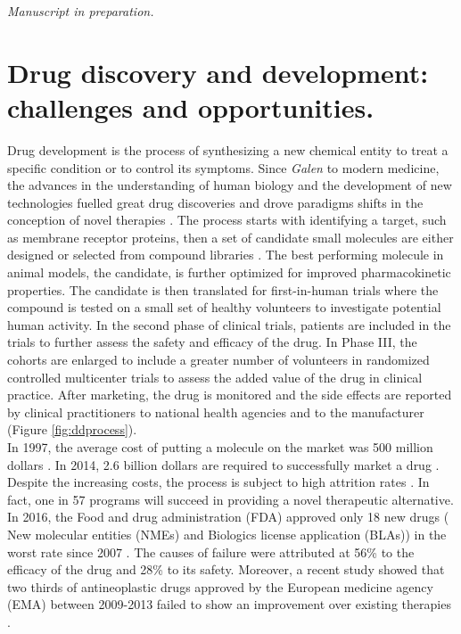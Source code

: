 \textit{Manuscript in preparation.}

\section{Drug discovery and development: challenges and opportunities.}
Drug development is the process of synthesizing a new chemical entity to treat a specific condition or to control its symptoms. Since \textit{Galen} to modern medicine, the advances in the understanding of human biology and the development of new technologies fuelled great drug discoveries and drove paradigms shifts in the conception of novel therapies \cite{drews2000drug,knowles2003target}. The process starts with identifying a target, such as membrane receptor proteins, then a set of candidate small molecules are either designed or selected from compound libraries \cite{cook2014lessons,willmann2008molecular}. The best performing molecule in animal models, the candidate, is further optimized for improved pharmacokinetic properties. The candidate is then translated for first-in-human trials where the compound is tested on a small set of healthy volunteers to investigate potential human activity. In the second phase of clinical trials, patients are included in the trials to further assess the safety and efficacy of the drug. In Phase III, the cohorts are enlarged to include a greater number of volunteers in randomized controlled multicenter trials to assess the added value of the drug in clinical practice. After marketing, the drug is monitored and the side effects are reported by clinical practitioners to national health agencies and to the manufacturer \cite{wise2009new} (Figure \ref{fig:ddprocess}).\\
In 1997, the average cost of putting a molecule on the market was 500 million dollars \cite{rawlins2004cutting,dimasi2003price}. In 2014, 2.6 billion dollars are required to successfully market a drug \cite{mullard2014new,dimasi2016innovation}. Despite the increasing costs, the process is subject to high attrition rates \cite{cook2014lessons}. In fact, one in 57 programs will succeed in providing a novel therapeutic alternative. In 2016, the Food and drug administration (FDA) approved only 18 new drugs ( New molecular entities (NMEs) and Biologics license application (BLAs)) in the worst rate since 2007 \cite{mullard20172016}. The causes of failure were attributed at 56\% to the efficacy of the drug and 28\% to its safety. Moreover, a recent study showed that two thirds of antineoplastic drugs approved by the European medicine agency (EMA) between 2009-2013 failed to show an improvement over existing therapies \cite{davis2017availability}.\\
